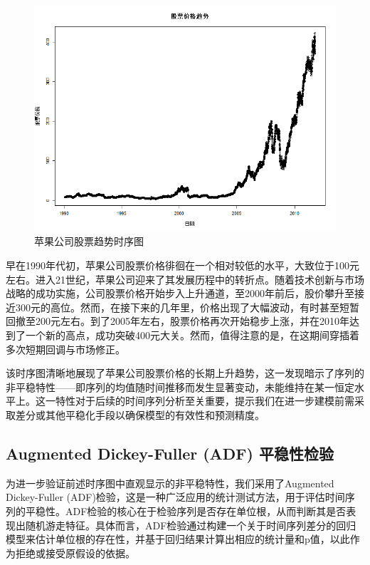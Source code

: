 \documentclass{article} %
\begin{document}
\begin{figure}[h] %
	\centering %
	\includegraphics[width=\textwidth]{pic/stock.png}
    \caption{苹果公司股票趋势时序图} %
	\label{} %
\end{figure}

早在1990年代初，苹果公司股票价格徘徊在一个相对较低的水平，大致位于100元左右。进入21世纪，苹果公司迎来了其发展历程中的转折点。随着技术创新与市场战略的成功实施，公司股票价格开始步入上升通道，至2000年前后，股价攀升至接近300元的高位。然而，在接下来的几年里，价格出现了大幅波动，有时甚至短暂回撤至200元左右。到了2005年左右，股票价格再次开始稳步上涨，并在2010年达到了一个新的高点，成功突破400元大关。然而，值得注意的是，在这期间穿插着多次短期回调与市场修正。

该时序图清晰地展现了苹果公司股票价格的长期上升趋势，这一发现暗示了序列的非平稳特性——即序列的均值随时间推移而发生显著变动，未能维持在某一恒定水平上。这一特性对于后续的时间序列分析至关重要，提示我们在进一步建模前需采取差分或其他平稳化手段以确保模型的有效性和预测精度。

\FloatBarrier

\subsection{Augmented Dickey-Fuller (ADF) 平稳性检验}

为进一步验证前述时序图中直观显示的非平稳特性，我们采用了Augmented Dickey-Fuller (ADF)检验，这是一种广泛应用的统计测试方法，用于评估时间序列的平稳性。ADF检验的核心在于检验序列是否存在单位根，从而判断其是否表现出随机游走特征。具体而言，ADF检验通过构建一个关于时间序列差分的回归模型来估计单位根的存在性，并基于回归结果计算出相应的统计量和p值，以此作为拒绝或接受原假设的依据。
\end{document}
